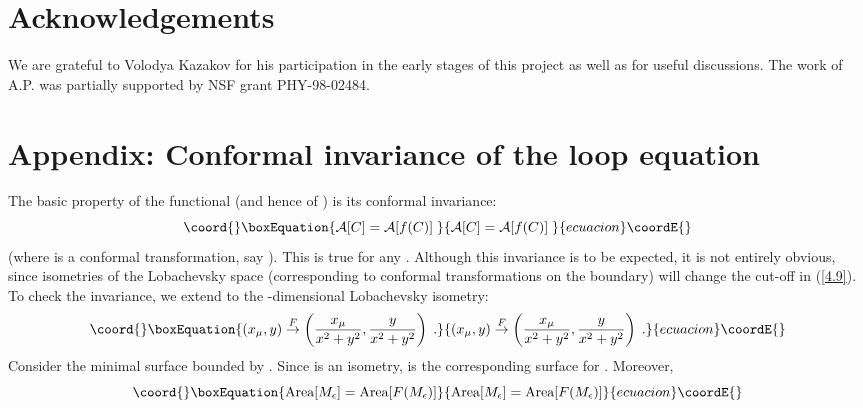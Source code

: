 \documentclass[a4paper,12pt]{article}
\numberwithin{equation}{section}
\begin{document}
\section*{Acknowledgements}

We are grateful to Volodya Kazakov for his participation in the early stages
of this project as well as for useful discussions. The work of A.P. was partially
supported by NSF grant PHY-98-02484. 


\section*{Appendix: Conformal invariance of the loop equation}

The basic property of the functional \coordHE{} (and hence of \coordHE{})
is its conformal invariance: 
\begin{equation}\coord{}\boxEquation{
\label{9.5}
\mathcal{A}[C]=\mathcal{A}[f(C)]\; 
}{
\mathcal{A}[C]=\mathcal{A}[f(C)]\; 
}{ecuacion}\coordE{}\end{equation}
 (where \coordHE{} is a conformal transformation, say \coordHE{}).
This is true for any \coordHE{}. Although this invariance is to be expected, it
is not entirely obvious, since isometries of the Lobachevsky space (corresponding
to conformal transformations on the boundary) will change the cut-off \myHighlight{\( \epsilon  \)}\coordHE{}
in (\ref{4.9}). To check the invariance, we extend \coordHE{} to the \coordHE{}-dimensional
Lobachevsky isometry:
\begin{equation}\coord{}\boxEquation{
\label{9.2}
(x_{\mu },y)\stackrel{{F}}{\rightarrow }\left( \frac{x_{\mu }}{x^{2}+y^{2}},\frac{y}{x^{2}+y^{2}}\right) \; .
}{
(x_{\mu },y)\stackrel{{F}}{\rightarrow }\left( \frac{x_{\mu }}{x^{2}+y^{2}},\frac{y}{x^{2}+y^{2}}\right) \; .
}{ecuacion}\coordE{}\end{equation}
Consider the minimal surface \coordHE{} bounded by \coordHE{}. Since \coordHE{} is
an isometry, \coordHE{} is the corresponding surface for \coordHE{}. Moreover,
\begin{equation}\coord{}\boxEquation{
\label{9.3}
\textrm{Area}[M_{\epsilon }]=\textrm{Area}[F(M_{\epsilon })]
}{
\textrm{Area}[M_{\epsilon }]=\textrm{Area}[F(M_{\epsilon })]
}{ecuacion}\coordE{}\end{equation}
\end{document}
